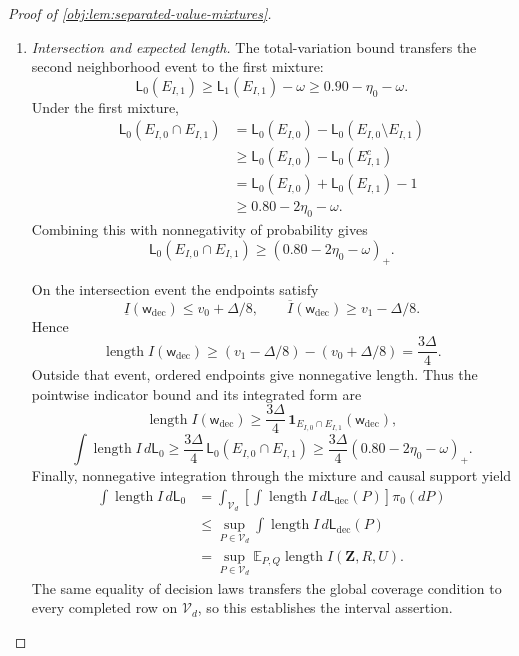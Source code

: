 \begin{proof}[Proof of \cref{obj:lem:separated-value-mixtures}]
\begin{enumerate}
\item \textit{Intersection and expected length.}
The total-variation bound transfers the second neighborhood event to the first mixture:
\[
\mathsf L_0(E_{I,1})
\ge\mathsf L_1(E_{I,1})-\omega
\ge0.90-\eta_0-\omega.
\]
Under the first mixture,
\[
\begin{aligned}
\mathsf L_0(E_{I,0}\cap E_{I,1})
&=
\mathsf L_0(E_{I,0})
-\mathsf L_0(E_{I,0}\setminus E_{I,1})\\
&\ge
\mathsf L_0(E_{I,0})-\mathsf L_0(E_{I,1}^c)\\
&=
\mathsf L_0(E_{I,0})+\mathsf L_0(E_{I,1})-1\\
&\ge0.80-2\eta_0-\omega.
\end{aligned}
\]
Combining this with nonnegativity of probability gives
\[
\mathsf L_0(E_{I,0}\cap E_{I,1})
\ge(0.80-2\eta_0-\omega)_+.
\]

On the intersection event the endpoints satisfy
\[
\underline I(\mathsf w_{\mathrm{dec}})\le v_0+\Delta/8,
\qquad
\overline I(\mathsf w_{\mathrm{dec}})\ge v_1-\Delta/8.
\]
Hence
\[
\operatorname{length}I(\mathsf w_{\mathrm{dec}})
\ge
(v_1-\Delta/8)-(v_0+\Delta/8)
=\frac{3\Delta}{4}.
\]
Outside that event, ordered endpoints give nonnegative length. Thus the pointwise indicator bound and its integrated form are
\[
\operatorname{length}I(\mathsf w_{\mathrm{dec}})
\ge
\frac{3\Delta}{4}\,
\mathbf1_{E_{I,0}\cap E_{I,1}}(\mathsf w_{\mathrm{dec}}),
\]
\[
\int\operatorname{length}I\,d\mathsf L_0
\ge
\frac{3\Delta}{4}\,
\mathsf L_0(E_{I,0}\cap E_{I,1})
\ge
\frac{3\Delta}{4}(0.80-2\eta_0-\omega)_+.
\]
Finally, nonnegative integration through the mixture and causal support yield
\[
\begin{aligned}
\int\operatorname{length}I\,d\mathsf L_0
&=
\int_{\mathcal V_d}
\left[
\int\operatorname{length}I\,d\mathsf L_{\mathrm{dec}}(P)
\right]\pi_0(dP)\\
&\le
\sup_{P\in\mathcal V_d}
\int\operatorname{length}I\,d\mathsf L_{\mathrm{dec}}(P)\\
&=
\sup_{P\in\mathcal V_d}
\mathbb E_{P,Q}\operatorname{length}I(\mathbf Z,R,U).
\end{aligned}
\]
The same equality of decision laws transfers the global coverage condition to every completed row on \(\mathcal V_d\), so this establishes the interval assertion.
\end{enumerate}
\end{proof}

